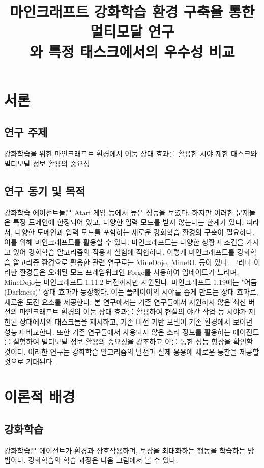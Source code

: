 \documentclass{tudelftposter}
\title{마인크래프트 강화학습 환경 구축을 통한 멀티모달 연구\\
\large 와 특정 태스크에서의 우수성 비교}
\begin{document}
\section{서론}
\subsection{연구 주제}
강화학습을 위한 마인크래프트 환경에서 어둠 상태 효과를 활용한 시야 제한 태스크와 멀티모달 정보 활용의 중요성

\subsection{연구 동기 및 목적}
강화학습 에이전트들은 Atari 게임 등에서 높은 성능을 보였다. 하지만 이러한 문제들은 특정 도메인에 한정되어 있고, 다양한 입력 모드를 받지 않는다는 한계가 있다. 따라서, 다양한 도메인과 입력 모드를 포함하는 새로운 강화학습 환경의 구축이 필요하다. 이를 위해 마인크래프트를 활용할 수 있다. 마인크래프트는 다양한 상황과 조건을 가지고 있어 강화학습 알고리즘의 적용과 실험에 적합하다. 이렇게 마인크래프트를 강화학습 알고리즘 환경으로 활용한 관련 연구로는 MineDojo, MineRL 등이 있다. 그러나 이러한 환경들은 오래된 모드 프레임워크인 Forge를 사용하여 업데이트가 느리며, MineDojo는 마인크래프트 1.11.2 버전까지만 지원된다. 마인크래프트 1.19에는 "어둠(Darkness)" 상태 효과가 등장했다. 이는 플레이어의 시야를 좁게 만드는 상태 효과로, 새로운 도전 요소를 제공한다. 본 연구에서는 기존 연구들에서 지원하지 않은 최신 버전의 마인크래프트 환경의 어둠 상태 효과를 활용하여 현실의 야간 작업 등 시야가 제한된 상태에서의 태스크들을 제시하고, 기존 비전 기반 모델이 기존 환경에서 보이던 성능과 비교한다. 또한 기존 연구들에서 사용되지 않은 소리 정보를 활용하는 에이전트를 실험하여 멀티모달 정보 활용의 중요성을 강조하고 이를 통한 성능 향상을 확인할 것이다. 이러한 연구는 강화학습 알고리즘의 발전과 실제 응용에 새로운 통찰을 제공할 것으로 기대된다.

\section{이론적 배경}
\subsection{강화학습}
강화학습은 에이전트가 환경과 상호작용하며, 보상을 최대화하는 행동을 학습하는 방법이다. 강화학습의 학습 과정은 다음 그림에서 볼 수 있다.
\end{document}
